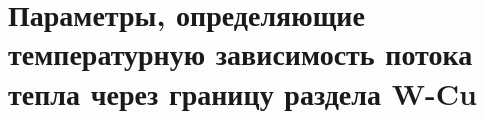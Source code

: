 \chapter{Параметры, определяющие температурную зависимость потока тепла через границу раздела W-Cu}\label{app:C}

